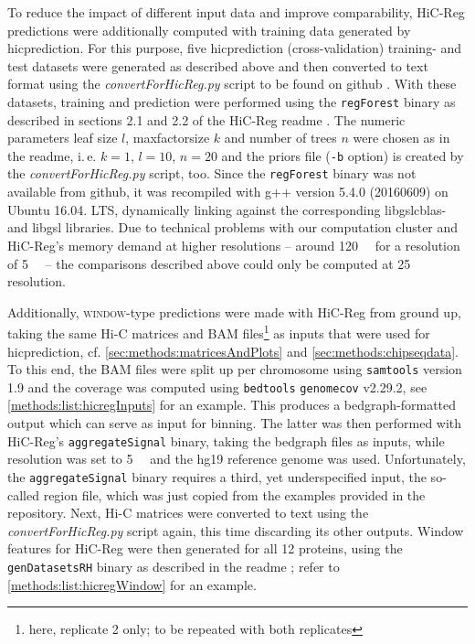 To reduce the impact of different input data and improve comparability, 
HiC-Reg predictions were additionally computed with training data 
generated by hicprediction.
For this purpose, five hicprediction (cross-validation) training- and test datasets were generated as described above and then 
converted to text format using the \emph{convertForHicReg.py} script to be found on github \cite{Krauth2020}.
With these datasets, training and prediction were performed using the \texttt{regForest} binary as 
described in sections 2.1 and 2.2 of the HiC-Reg readme \cite{Roy2020}.
The numeric parameters leaf size $l$, maxfactorsize $k$ and number of trees $n$ were
chosen as in the readme, i.\,e. $k=1$, $l=10$, $n=20$ and 
the priors file (\texttt{-b} option) is created by the \emph{convertForHicReg.py} script, too.
Since the \texttt{regForest} binary was not available from github, it was recompiled
with g++ version 5.4.0 (20160609) on Ubuntu 16.04. LTS, dynamically linking against the
corresponding libgslcblas- and libgsl libraries.
Due to technical problems with our computation cluster and HiC-Reg's memory demand at higher resolutions 
-- around \SI{120}{\giga\byte} for a resolution of \SI{5}{\kilo\bp} -- 
the comparisons described above could only be computed at \SI{25}{\kilo\bp} resolution.

Additionally, \textsc{window}-type predictions were made with HiC-Reg from ground up,
taking the same Hi-C matrices and BAM files\footnote{here, replicate 2 only; to be repeated with both replicates} 
as inputs that were used for hicprediction, 
cf. \autoref{sec:methods:matricesAndPlots} and \ref{sec:methods:chipseqdata}.
To this end, the BAM files were split up 
per chromosome using \texttt{samtools} version 1.9
and the coverage was computed using \texttt{bedtools} \texttt{genomecov} v2.29.2, 
see \autoref{methods:list:hicregInputs} for an example. 
This produces a bedgraph-formatted output which can serve as input for binning.
The latter was then performed with HiC-Reg's \texttt{aggregateSignal} binary, 
taking the bedgraph files as inputs, while resolution was set to \SI{5}{\kilo\bp} and the hg19 reference genome was used. 
Unfortunately, the \texttt{aggregateSignal} binary requires a third, yet underspecified input, 
the so-called region file, which was just copied from the examples provided in the repository.
Next, Hi-C matrices were converted to text using the \emph{convertForHicReg.py} script again, this time discarding its other outputs.
Window features for HiC-Reg were then generated for all 12 proteins,
using the \texttt{genDatasetsRH} binary as described in the readme \cite{Roy2020}; refer to \autoref{methods:list:hicregWindow} for an example.

